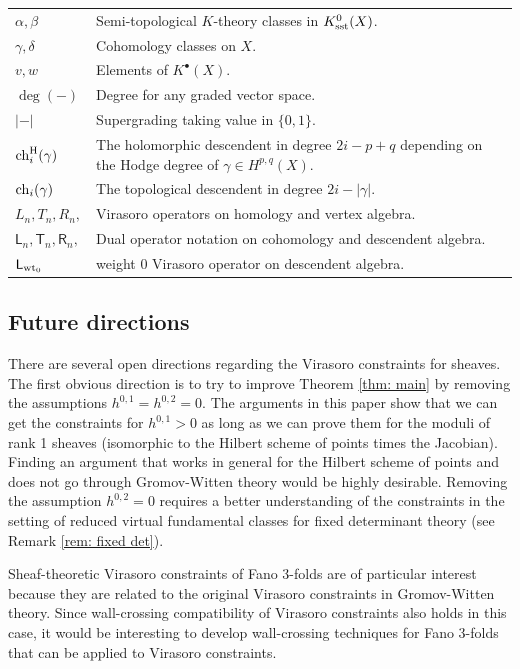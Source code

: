 \documentclass[a4paper, 12pt]{amsart}
\begin{document}
\begin{center}
    \begin{tabular}{p{4cm} p{10cm}}
    $\alpha,\beta$& Semi-topological $K$-theory classes in $K_{\text{sst}}^0(X)$.\\
    $\gamma, \delta$&  Cohomology classes on $X$. \\
    $v,w$& Elements of $K^\bullet(X)$.\\
    $\deg(-)$ & Degree for any graded vector space. 
    \\
    $|-|$& Supergrading taking value in $\{0,1\}. $   \\
    $\mathrm{ch}^{\mathrm{H}}_i(\gamma)$ & The holomorphic descendent in degree $2i-p+q$ depending on the Hodge degree of $\gamma\in H^{p,q}(X)$.\\
    $\mathrm{ch}_i(\gamma)$& The topological descendent in degree $2i-|\gamma|$. \\
     $L_n, T_n, R_n,$& Virasoro operators on homology and vertex algebra.\\
    $\mathsf{L}_n, \mathsf{T}_n,\mathsf{R}_n,$& Dual operator notation on cohomology and descendent algebra.\\
    $\mathsf{L}_{{\mathrm{wt}_0}}$& weight 0 Virasoro operator on descendent algebra.
        \end{tabular}
\end{center}

\subsection{Future directions} 
There are several open directions regarding the Virasoro constraints for sheaves. The first obvious direction is to try to improve Theorem \ref{thm: main} by removing the assumptions $h^{0,1}=h^{0,2}=0$. The arguments in this paper show that we can get the constraints for $h^{0,1}>0$ as long as we can prove them for the moduli of rank 1 sheaves (isomorphic to the Hilbert scheme of points times the Jacobian). Finding an argument that works in general for the Hilbert scheme of points and does not go through Gromov-Witten theory would be highly desirable. Removing the assumption $h^{0,2}=0$ requires a better understanding of the constraints in the setting of reduced virtual fundamental classes for fixed determinant theory (see Remark \ref{rem: fixed det}).

Sheaf-theoretic Virasoro constraints of Fano 3-folds are of particular interest because they are related to the original Virasoro constraints in Gromov-Witten theory. Since wall-crossing compatibility of Virasoro constraints also holds in this case, it would be interesting to develop wall-crossing techniques for Fano 3-folds that can be applied to Virasoro constraints.
\end{document}
